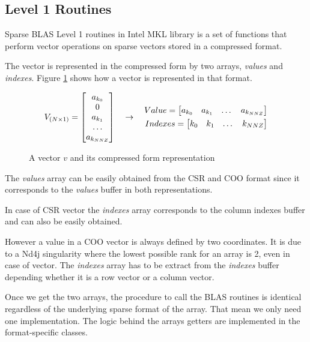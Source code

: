 \subsection{Level 1 Routines}

Sparse BLAS Level 1 routines in Intel MKL library \cite{mkllvl1} is a set of functions that perform vector operations on sparse vectors stored in a compressed format.	

The vector is represented in the compressed form by two arrays, \textit{values} and \textit{indexes}. Figure \ref{fig:compressedVector} shows how a vector is represented in that format.

\begin{figure}[h]
	\[
	\centering
	V_{(N\times 1)} = 
	\begin{bmatrix}
	a_{k_{0}}\\
	0\\
	a_{k_{1}}\\
	\dots\\
	a_{k_{NNZ}}
	\end{bmatrix}
	\quad\rightarrow\quad
	\begin{aligned}
		Value = 
		\begin{bmatrix}
		a_{k_{0}}& a_{{k_{1}}} & \dots & a_{k_{NNZ}}
		\end{bmatrix}\\
		Indexes = 
		\begin{bmatrix}
		k_{0} & k_{1} & \dots & k_{NNZ}		
		\end{bmatrix}
	\end{aligned}
	\]
	\caption{A vector $v$ and its compressed form representation}
	\label{fig:compressedVector}
\end{figure}


The \textit{values} array can be easily obtained from the CSR and COO format since it corresponds to the \textit{values} buffer in both representations.

In case of CSR vector the \textit{indexes} array corresponds to the column indexes buffer and can also be easily obtained.

However a value in a COO vector is always defined by two coordinates. It is due to a Nd4j singularity where the lowest possible rank for an array is 2, even in case of vector. The \textit{indexes} array has to be extract from the \textit{indexes} buffer depending whether it is a row vector or a column vector.

Once we get the two arrays, the procedure to call the BLAS routines is identical regardless of the underlying sparse format of the array. That mean we only need one implementation. The logic behind the arrays getters are implemented in the format-specific classes. 


